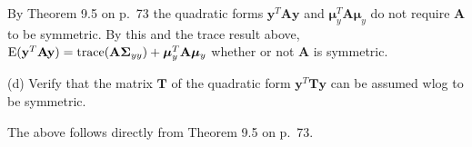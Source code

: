 \bigskip
\noindent
By Theorem 9.5 on p.\ 73 the quadratic forms
$\mathbf y^T\mathbf{Ay}$
and
$\bm\mu_y^T\mathbf A\bm\mu_y$
do not require $\mathbf A$ to be symmetric.
By this and the trace result above,
$\mathrm E(\mathbf y^T\mathbf{Ay})
=\mathop{\rm trace}(\mathbf{A\Sigma}_{yy})
+\bm\mu_y^T\mathbf A\bm\mu_y$
whether or not $\mathbf A$ is symmetric.

\bigskip
\noindent
(d) Verify that the matrix $\mathbf T$ of the quadratic form
$\mathbf y^T\mathbf{Ty}$ can be assumed wlog to be symmetric.

\bigskip
\noindent
The above follows directly from Theorem 9.5 on p.\ 73.



